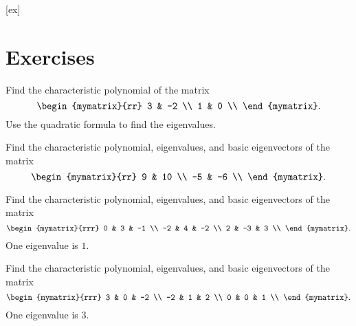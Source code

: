 [ex]
\section*{Exercises}


\begin{ex}
  Find the characteristic polynomial of the matrix
  \begin{equation*}
    \begin{mymatrix}{rr}
      3 &  -2 \\
      1 &   0 \\
    \end{mymatrix}.
  \end{equation*}
  Use the quadratic formula to find the eigenvalues.
\end{ex}

\begin{ex}
  Find the characteristic polynomial, eigenvalues, and basic
  eigenvectors of the matrix
  \begin{equation*}
    \begin{mymatrix}{rr}
      9 &  10 \\
      -5 &  -6 \\
    \end{mymatrix}.
  \end{equation*}
\end{ex}

\begin{ex}
  Find the characteristic polynomial, eigenvalues, and basic
  eigenvectors of the matrix
  \begin{equation*}
    \begin{mymatrix}{rrr}
      0 &   3 &  -1 \\
      -2 &   4 &  -2 \\
      2 &  -3 &   3 \\
    \end{mymatrix}.
  \end{equation*}
  One eigenvalue is $1$.
\end{ex}

\begin{ex}
  Find the characteristic polynomial, eigenvalues, and basic
  eigenvectors of the matrix
  \begin{equation*}
    \begin{mymatrix}{rrr}
      3 &   0 &  -2 \\
      -2 &   1 &   2 \\
      0 &   0 &   1 \\
    \end{mymatrix}.
  \end{equation*}
  One eigenvalue is $3$.
\end{ex}

